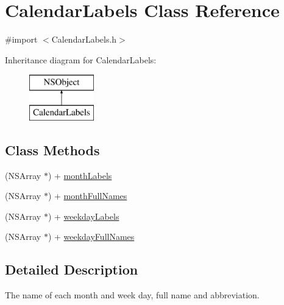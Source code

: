 \hypertarget{interface_calendar_labels}{\section{Calendar\+Labels Class Reference}
\label{interface_calendar_labels}
}


{\ttfamily \#import $<$Calendar\+Labels.\+h$>$}

Inheritance diagram for Calendar\+Labels\+:\begin{figure}[H]
\begin{center}
\leavevmode
\includegraphics[height=2.000000cm]{interface_calendar_labels}
\end{center}
\end{figure}
\subsection*{Class Methods}
\begin{DoxyCompactItemize}
\item 
(N\+S\+Array $\ast$) + \hyperlink{interface_calendar_labels_ae5c1ae4bfefd17cb6b5ee6455f16d191}{month\+Labels}
\item 
(N\+S\+Array $\ast$) + \hyperlink{interface_calendar_labels_a38a5230b8cef47a05b1574d2235c0084}{month\+Full\+Names}
\item 
(N\+S\+Array $\ast$) + \hyperlink{interface_calendar_labels_ad293ccff4cf8f0ec9e195f6745adbd53}{weekday\+Labels}
\item 
(N\+S\+Array $\ast$) + \hyperlink{interface_calendar_labels_aa21867365c68e93d1cadeaf55df805ec}{weekday\+Full\+Names}
\end{DoxyCompactItemize}


\subsection{Detailed Description}
The name of each month and week day, full name and abbreviation. 

